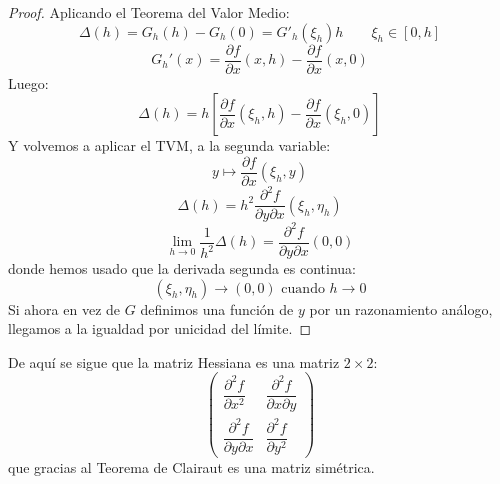 \begin{teo}[de Clairaut]
\begin{proof}
    Aplicando el Teorema del Valor Medio:
    \begin{equation*}
        \Delta(h) = G_h(h) - G_h(0) = G'_h(\xi_h) h \qquad \xi_h \in [0,h]
    \end{equation*}
    \begin{equation*}
        G_h'(x) = \dfrac{\partial f}{\partial x}(x,h) - \dfrac{\partial f}{\partial x}(x,0)
    \end{equation*}
    Luego:
    \begin{equation*}
        \Delta(h) = h\left[\dfrac{\partial f}{\partial x}(\xi_h,h)-\dfrac{\partial f}{\partial x}(\xi_h,0)\right]
    \end{equation*}
    Y volvemos a aplicar el TVM, a la segunda variable:
    \begin{equation*}
        y \longmapsto \dfrac{\partial f}{\partial x}(\xi_h, y)
    \end{equation*}
    \begin{equation*}
        \Delta(h) = h^2 \dfrac{\partial^2 f}{\partial y\partial x}(\xi_h, \eta_h)
    \end{equation*}
    \begin{equation*}
        \lim_{h\to0} \dfrac{1}{h^2} \Delta(h) = \dfrac{\partial^2 f}{\partial y\partial x}(0,0)
    \end{equation*}
    donde hemos usado que la derivada segunda es continua:
    \begin{equation*}
        (\xi_h, \eta_h) \rightarrow (0,0) \text{\ cuando\ } h\rightarrow0
    \end{equation*}
    Si ahora en vez de $G$ definimos una función de $y$ por un razonamiento análogo, llegamos a la igualdad por unicidad del límite.
\end{proof}
\end{teo}

De aquí se sigue que la matriz Hessiana es una matriz $2\times 2$:
\begin{equation*}
    \left(\begin{array}{cc}
            \dfrac{\partial^2 f}{\partial x^2} & \dfrac{\partial^2 f}{\partial x\partial y} \\
            \dfrac{\partial^2 f}{\partial y\partial x} & \dfrac{\partial^2 f}{\partial y^2}
    \end{array}\right)
\end{equation*}
que gracias al Teorema de Clairaut es una matriz simétrica.


